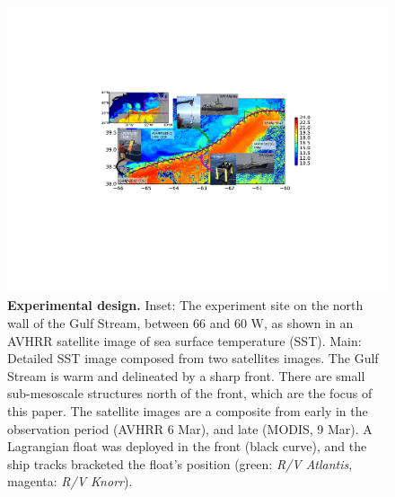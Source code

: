 \documentclass{natureJMK}
\begin{document}
\begin{figure}[htbp]
  \centering
    \includegraphics[width=\textwidth]{./SatOverviewSecDTry2.pdf}
   \caption{{\bf Experimental design.}  Inset: The experiment site on the north wall of the Gulf Stream, between 66 and 60 W, as shown in an AVHRR satellite image of sea surface temperature (SST).  Main:  Detailed SST image composed from two satellites images.    The Gulf Stream is warm and delineated by a sharp front.  There are small sub-mesoscale structures north of the front, which are the focus of this paper.  The satellite images are a composite from early in the observation period (AVHRR 6 Mar), and late (MODIS, 9 Mar).  A Lagrangian float was deployed in the front (black curve), and the ship tracks bracketed the float's position (green: \emph{R/V Atlantis}, magenta: \emph{R/V Knorr}).   }\label{fig:SatOverviewSectD}
\end{figure}
\end{document}
